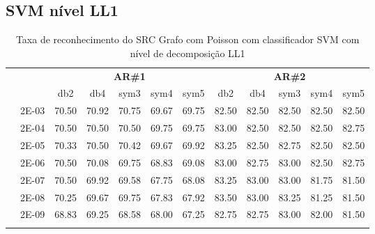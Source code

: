 \begin{table}[H]
\begin{tabular}{|c|c|c c c c c|c c c c c|}
\\\midrule
\end{tabular}

\end{table}








\subsection{SVM nível LL1}

\begin{table}[H]
	\centering
    \normalsize
	\caption{Taxa de reconhecimento do SRC Grafo com Poisson com classificador SVM com nível de decomposição LL1}
	\begin{tabular}{|c|c|c c c c c|c c c c c|}
\cline{3-12}
\multicolumn{2}{c|}{\multirow{2}{*}{}} & \multicolumn{5}{c|}{\textbf{AR\#1}}  & \multicolumn{5}{c|}{\textbf{AR\#2}} \\\cline{3-12}

\multicolumn{2}{c|}{}  & db2 & db4 & sym3 & sym4 & sym5 & db2 & db4& sym3 & sym4 & sym5 \\\hline
\multicolumn{1}{|c|}{ \multirow{6}{*}{\rotatebox[origin=c]{90}{\textbf{Gamma}}} }
&2E-03&	70.50 &	70.92 &	70.75	&69.67 &	69.75&	82.50 &	82.50 &	82.50 &	82.50&	82.50	\\\cline{2-12}
&2E-04&	70.50 &	70.50 &	70.50	&69.75 &	69.75&	83.00 &	82.50 &	82.50 &	82.50&	82.75	\\\cline{2-12}
&2E-05&	70.33 &	70.50 &	70.42	&69.67 &	69.92&	83.25 &	82.50 &	82.75 &	82.50&	82.50	\\\cline{2-12}
&2E-06&	70.50 &	70.08 &	69.75	&68.83 &	69.08&	83.00 &	82.75 &	83.00 &	82.50&	82.75	\\\cline{2-12}
&2E-07&	70.50 &	69.92 &	69.58	&67.75 &	68.08&	83.25 &	83.00 &	83.00 &	81.75&	81.50	\\\cline{2-12}
&2E-08&	70.25 &	69.67 &	69.75	&67.83 &	67.92&	83.50 &	83.00 &	83.25 &	81.25&	81.50	\\\cline{2-12}
&2E-09&	68.83 &	69.25 &	68.58	&68.00 &	67.25&	82.75 &	82.75 &	83.00 &	82.00&	81.50	

	

	
\\ \midrule
\multicolumn{12}{c}{}\\ 


\end{tabular}
\end{table}
